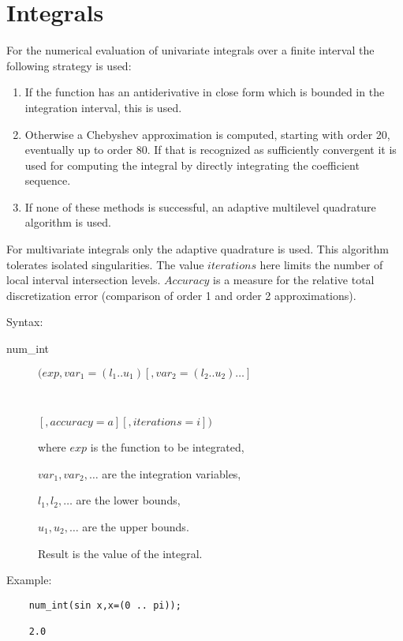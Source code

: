 \section{Integrals}
\hypertarget{operator:NUM_INT}{}

For the numerical evaluation of univariate integrals over a finite
interval the following strategy is used:
\begin{enumerate}
\item If the function has an antiderivative in close form
    which is bounded in the integration interval, this
    is used.
\item Otherwise a Chebyshev approximation is computed,
    starting with order 20, eventually up to order 80.
    If that is recognized as sufficiently convergent
    it is used for computing the integral by directly
    integrating the coefficient sequence.
\item If none of these methods is successful, an
    adaptive multilevel quadrature algorithm is used.
\end{enumerate}
For multivariate integrals only the adaptive quadrature is used.
This algorithm tolerates isolated singularities.
The value $iterations$ here limits the number of
local interval intersection levels.
$Accuracy$ is a measure for the relative total discretization
error (comparison of order 1 and order 2 approximations).

Syntax:

\begin{description}
\item[num\_int] $(exp,var_1=(l_1 .. u_1)[,var_2=(l_2 .. u_2)\ldots]$
\item[\ \ \ \ \ \ ]$[,accuracy=a][,iterations=i])$

where $exp$ is the function to be integrated,

$var_1, var_2 , \ldots$ are the integration variables,

$l_1, l_2 , \ldots$ are the lower bounds,

$u_1, u_2 , \ldots$ are the upper bounds.

Result is the value of the integral.

\end{description}

Example:

\begin{verbatim}
    num_int(sin x,x=(0 .. pi));

    2.0
\end{verbatim}

